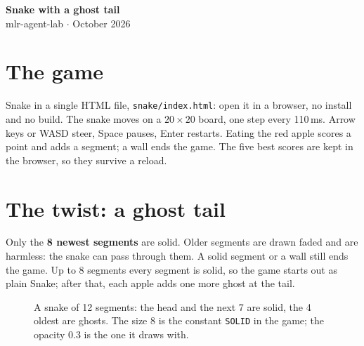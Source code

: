 \documentclass[11pt,a4paper]{article}
\begin{document}
\begin{center}
  {\LARGE\bfseries Snake with a ghost tail}\\[3pt]
  mlr-agent-lab \quad$\cdot$ October 2026
\end{center}

\section*{The game}
Snake in a single HTML file, \texttt{snake/index.html}: open it in a browser, no install and no build.
The snake moves on a $20\times20$ board, one step every 110\,ms. Arrow keys or WASD steer, Space pauses, Enter restarts.
Eating the red apple scores a point and adds a segment; a wall ends the game. The five best scores are kept in the browser, so they survive a reload.

\section*{The twist: a ghost tail}
Only the \textbf{8 newest segments} are solid. Older segments are drawn faded and are harmless: the snake can pass through them.
A solid segment or a wall still ends the game. Up to 8 segments every segment is solid, so the game starts out as plain Snake; after that, each apple adds one more ghost at the tail.

\begin{figure}[h]
\centering
{}
\caption{A snake of 12 segments: the head and the next 7 are solid, the 4 oldest are ghosts.
The size 8 is the constant \texttt{SOLID} in the game; the opacity 0.3 is the one it draws with.}
\end{figure}
\end{document}
